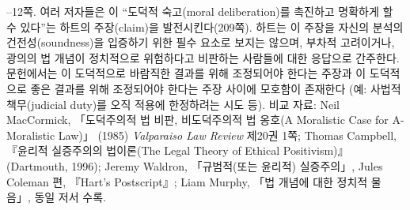 {--12쪽.  여러 저자들은 이 “도덕적 숙고(moral
deliberation)를 촉진하고 명확하게 할 수 있다”는 하트의 주장(claim)을
발전시킨다(209쪽). 하트는 이 주장을 자신의 분석의 건전성(soundness)을
입증하기 위한 필수 요소로 보지는 않으며, 부차적 고려이거나, 광의의 법
개념이 정치적으로 위험하다고 비판하는 사람들에 대한 응답으로 간주한다.
문헌에서는 이 도덕적으로 바람직한
결과를 위해 조정되어야 한다는 주장과 이 도덕적으로 좋은 결과를 위해 조정되어야 한다는 주장 사이에
모호함이 존재한다 (예: 사법적 책무(judicial duty)를 오직  적용에 한정하려는 시도 등). 비교 자료:
Neil MacCormick, 「도덕주의적 법 비판, 비도덕주의적 법 옹호(A Moralistic
Case for A-Moralistic Law)」 (1985) \emph{Valparaiso Law Review} 제20권
1쪽; Thomas Campbell, 『윤리적 실증주의의 법이론(The Legal Theory of
Ethical Positivism)』 (Dartmouth, 1996); Jeremy Waldron, 「규범적(또는
윤리적) 실증주의」, Jules Coleman 편, 『Hart's Postscript』; Liam
Murphy, 「법 개념에 대한 정치적 물음」, 동일 저서 수록.
}
